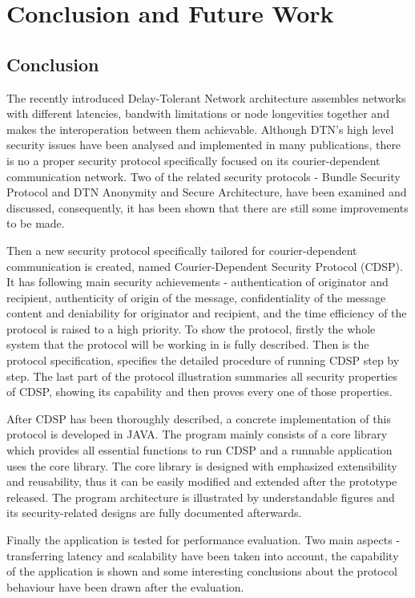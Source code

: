 \chapter{Conclusion and Future Work}
\section{Conclusion}
The recently introduced Delay-Tolerant Network architecture assembles networks with different latencies, bandwith limitations or node longevities together and makes the interoperation between them achievable. Although DTN's high level security issues have been analysed and implemented in many publications, there is no a proper security protocol specifically focused on its courier-dependent communication network. Two of the related security protocols - Bundle Security Protocol and DTN Anonymity and Secure Architecture, have been examined and discussed, consequently, it has been shown that there are still some improvements to be made.

Then a new security protocol specifically tailored for courier-dependent communication is created, named Courier-Dependent Security Protocol (CDSP). It has following main security achievements - authentication of originator and recipient, authenticity of origin of the message, confidentiality of the message content and deniability for originator and recipient, and the time efficiency of the protocol is raised to a high priority. To show the protocol, firstly the whole system that the protocol will be working in is fully described. Then is the protocol specification, specifies the detailed procedure of running CDSP step by step. The last part of the protocol illustration summaries all security properties of CDSP, showing its capability and then proves every one of those properties. 

After CDSP has been thoroughly described, a concrete implementation of this protocol is developed in JAVA. The program mainly consists of a core library which provides all essential functions to run CDSP and a runnable application uses the core library. The core library is designed with emphasized extensibility and reusability, thus it can be easily modified and extended after the prototype released. The program architecture is illustrated by understandable figures and its security-related designs are fully documented afterwards.

Finally the application is tested for performance evaluation. Two main aspects - transferring latency and scalability have been taken into account, the capability of the application is shown and some interesting conclusions about the protocol behaviour have been drawn after the evaluation.

